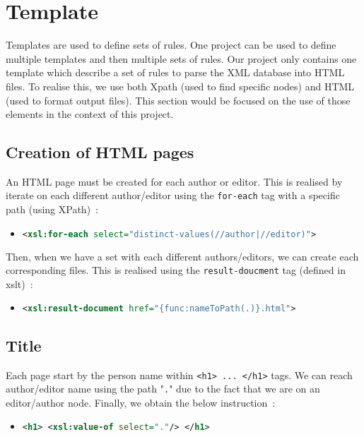 \documentclass{article}
\begin{document}
\section{Template}
  Templates are used to define sets of rules. One project can be used to define multiple templates and then multiple sets of rules. Our project only contains one template which describe a set of rules to parse the XML database into HTML files. To realise this, we use both Xpath (used to find specific nodes) and HTML (used to format output files). This section would be focused on the use of those elements in the context of this project.

  \subsection{Creation of HTML pages} 
  An HTML page must be created for each author or editor. This is realised by iterate on each different author/editor using the \verb|for-each| tag with a specific path (using XPath)~:
 \begin{itemize}
      \item \begin{lstlisting}[language=XML]
<xsl:for-each select="distinct-values(//author|//editor)">\end{lstlisting}
    \end{itemize}
    Then, when we have a set with each different authors/editors, we can create each corresponding files. This is realised using the \verb|result-doucment| tag (defined in xslt)~:
\begin{itemize}
      \item \begin{lstlisting}[language=XML]
<xsl:result-document href="{func:nameToPath(.)}.html">\end{lstlisting}
    \end{itemize}

  \subsection{Title}
    Each page start by the person name within \verb|<h1> ... </h1>| tags. We can reach author/editor name using the path "\verb|.|" due to the fact that we are on an editor/author node. Finally, we obtain the below instruction~:
    \begin{itemize}
      \item \begin{lstlisting}[language=XML]
<h1> <xsl:value-of select="."/> </h1>\end{lstlisting}
    \end{itemize}
\end{document}
